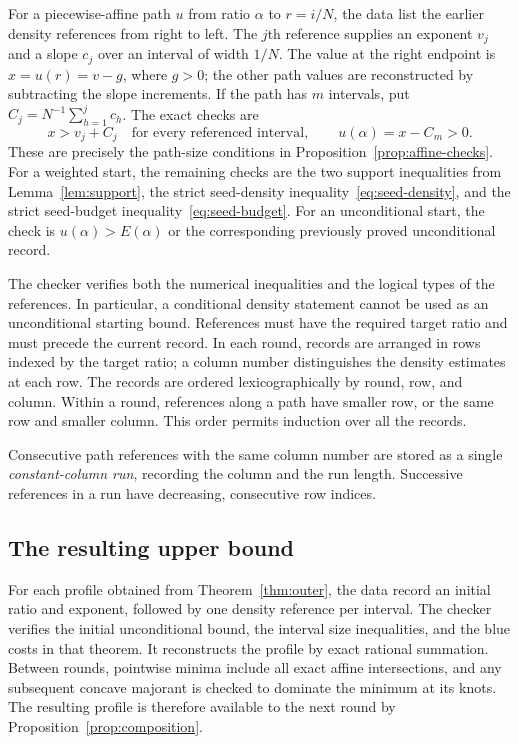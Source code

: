 \documentclass[11pt]{article}
\theoremstyle{definition}
\theoremstyle{remark}
\numberwithin{equation}{section}
\begin{document}
For a piecewise-affine path $u$ from ratio $\alpha$ to $r=i/N$, the
data list the earlier density references from right to left. The $j$th
reference supplies an exponent $v_j$ and a slope $c_j$ over an interval
of width $1/N$. The value at the right endpoint is $x=u(r)=v-g$,
where $g>0$; the other path values are reconstructed by subtracting
the slope increments. If the path has $m$ intervals, put
$C_j=N^{-1}\sum_{h=1}^j c_h$. The exact checks are
\[
 x>v_j+C_j\quad\text{for every referenced interval},\qquad
 u(\alpha)=x-C_m>0.
\]
These are precisely the path-size conditions in Proposition~\ref{prop:affine-checks}. For a weighted start, the remaining checks are the two support inequalities from Lemma~\ref{lem:support}, the strict seed-density inequality~\eqref{eq:seed-density}, and the strict seed-budget inequality~\eqref{eq:seed-budget}. For an unconditional start, the check is $u(\alpha)>E(\alpha)$ or the corresponding previously proved unconditional record.

The checker verifies both the numerical inequalities and the logical
types of the references. In particular, a conditional density
statement cannot be used as an unconditional starting bound.
References must have the required target ratio and must precede the
current record. In each round, records are arranged in rows indexed
by the target ratio; a column number distinguishes the density
estimates at each row. The records are ordered lexicographically by
round, row, and column. Within a round, references along a path have
smaller row, or the same row and smaller column. This order permits
induction over all the records.

Consecutive path references with the same column number are stored
as a single \emph{constant-column run}, recording the column and the
run length. Successive references in a run have decreasing,
consecutive row indices.

\subsection{The resulting upper bound}

For each profile obtained from Theorem~\ref{thm:outer}, the data
record an initial ratio and exponent, followed by one density
reference per interval. The checker verifies the initial
unconditional bound, the interval size inequalities, and the blue
costs in that theorem. It reconstructs the profile by exact rational
summation. Between rounds, pointwise minima include all exact affine
intersections, and any subsequent concave majorant is checked to
dominate the minimum at its knots. The resulting profile is therefore
available to the next round by Proposition~\ref{prop:composition}.
\end{document}
